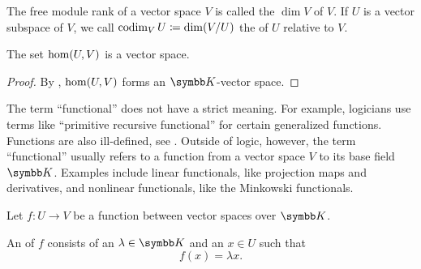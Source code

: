 \begin{definition}\label{def:vector_space_dimension}
  The free module rank of a vector space \( V \) is called the  \( \dim V \) of \( V \). If \( U \) is a vector subspace of \( V \), we call \( \operatorname{co}\!\dim_V U \coloneqq \dim(V/U) \) the  of \( U \) relative to \( V \).
\end{definition}

\begin{proposition}\label{thm:linear_maps_form_algebra}
  The set \( \operatorname{hom}(U, V) \) is a vector space.
\end{proposition}
\begin{proof}
  By , \( \operatorname{hom}(U, V) \) forms an \( \BK \)-vector space.
\end{proof}

\begin{remark}\label{remark:functional}
  The term \enquote{functional} does not have a strict meaning. For example, logicians use terms like \enquote{primitive recursive functional} for certain generalized functions. Functions are also ill-defined, see . Outside of logic, however, the term \enquote{functional} usually refers to a function from a vector space \( V \) to its base field \( \BK \). Examples include linear functionals, like projection maps and derivatives, and nonlinear functionals, like the Minkowski functionals.
\end{remark}

\begin{definition}\label{def:eigenpair}
  Let \( f: U \to V \) be a function between vector spaces over \( \BK \).

  An  of \( f \) consists of an  \( \lambda \in \BK \) and an  \( x \in U \) such that
  \begin{equation*}
    f(x) = \lambda x.
  \end{equation*}
\end{definition}
